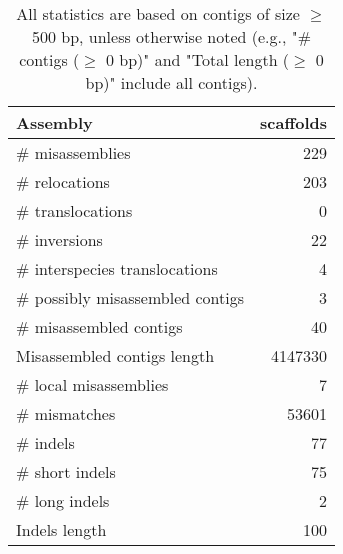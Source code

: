 \documentclass[12pt,a4paper]{article}
\begin{document}
\begin{table}[ht]
\begin{center}
\caption{All statistics are based on contigs of size $\geq$ 500 bp, unless otherwise noted (e.g., "\# contigs ($\geq$ 0 bp)" and "Total length ($\geq$ 0 bp)" include all contigs).}
\begin{tabular}{|l*{1}{|r}|}
\hline
Assembly & scaffolds \\ \hline
\# misassemblies & 229 \\ \hline
\hspace{5mm}\# relocations & 203 \\ \hline
\hspace{5mm}\# translocations & 0 \\ \hline
\hspace{5mm}\# inversions & 22 \\ \hline
\hspace{5mm}\# interspecies translocations & 4 \\ \hline
\# possibly misassembled contigs & 3 \\ \hline
\# misassembled contigs & 40 \\ \hline
Misassembled contigs length & 4147330 \\ \hline
\# local misassemblies & 7 \\ \hline
\# mismatches & 53601 \\ \hline
\# indels & 77 \\ \hline
\hspace{5mm}\# short indels & 75 \\ \hline
\hspace{5mm}\# long indels & 2 \\ \hline
Indels length & 100 \\ \hline
\end{tabular}
\end{center}
\end{table}
\end{document}
